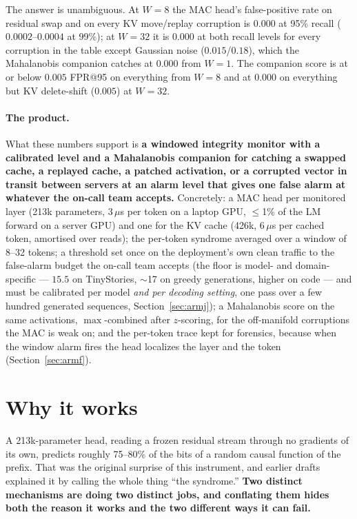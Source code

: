 \documentclass[10pt,twocolumn]{article}
\begin{document}
The answer is unambiguous. At $W{=}8$ the MAC head's false-positive rate on residual swap
and on every KV move/replay corruption is $0.000$ at 95\% recall ($0.0002$--$0.0004$ at
99\%); at $W{=}32$ it is $0.000$ at both recall levels for every corruption in the table
except Gaussian noise ($0.015$/$0.18$), which the Mahalanobis companion catches at
$0.000$ from $W{=}1$. The companion score is at or below $0.005$ FPR@95 on everything
from $W{=}8$ and at $0.000$ on everything but KV delete-shift ($0.005$) at $W{=}32$.

\paragraph{The product.} What these numbers support is \textbf{a windowed integrity
monitor with a calibrated level and a Mahalanobis companion for catching a swapped
cache, a replayed cache, a patched activation, or a corrupted vector in transit between
servers at an alarm level that gives one false alarm at whatever the on-call team
accepts.} Concretely: a MAC head per monitored layer (213k parameters, 3\,$\mu$s per
token on a laptop GPU, $\le$1\% of the LM forward on a server GPU) and one for the KV cache (426k,
6\,$\mu$s per cached token, amortised over reads); the per-token syndrome averaged over
a window of 8--32 tokens; a threshold set once on the deployment's own clean traffic
to the false-alarm budget the on-call team accepts (the floor is model- and
domain-specific --- $15.5$ on TinyStories, $\sim$17 on greedy generations, higher on
code --- and must be calibrated per model \emph{and per decoding setting}, one pass over
a few hundred generated sequences, Section~\ref{sec:armj}); a Mahalanobis score on the
same activations, $\max$-combined after $z$-scoring, for the off-manifold corruptions the
MAC is weak on; and the per-token trace kept for forensics, because when the window
alarm fires the head localizes the layer and the token (Section~\ref{sec:armf}).

\section{Why it works}\label{sec:why}
A 213k-parameter head, reading a frozen residual stream through no gradients of its
own, predicts roughly 75--80\% of the bits of a random causal function of the prefix.
That was the original surprise of this instrument, and earlier drafts explained it by
calling the whole thing ``the syndrome.'' \textbf{Two distinct mechanisms are doing
two distinct jobs, and conflating them hides both the reason it works and the two
different ways it can fail.}
\end{document}
